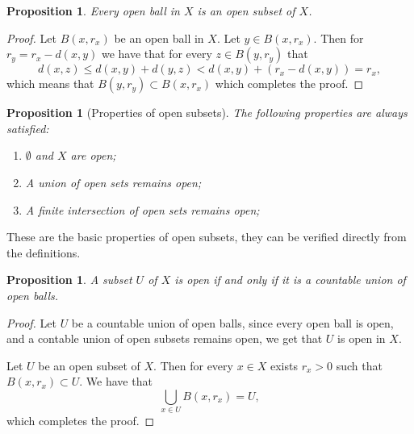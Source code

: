 \documentclass[11pt,a4paper]{article}
\theoremstyle{definition}
\theoremstyle{plain}
\newtheorem{proposition}[theorem]{Proposition}
\begin{document}
  \begin{proposition}
    Every open ball in $X$ is an open subset of $X$.
  \end{proposition}
  \begin{proof}
    Let $B(x,r_x)$ be an open ball in $X$. Let $y \in B(x,r_x)$. Then for
    $r_y = r_x - d(x,y)$ we have that for every $z \in B(y,r_y)$ that
    \[
      d(x,z) \le d(x,y) + d(y,z) < d(x,y) + (r_x - d(x,y)) = r_x,
    \]
    which means that $B(y,r_y) \subset B(x,r_x)$ which completes the proof.
  \end{proof}

  \begin{proposition}[Properties of open subsets]
    The following properties are always satisfied:
    \begin{enumerate}
      \item[(1)] $\emptyset$ and $X$ are open;
      \item[(2)] A union of open sets remains open;
      \item[(3)] A finite intersection of open sets remains open;
    \end{enumerate}
  \end{proposition}
  These are the basic properties of open subsets, they can be verified
  directly from the definitions.

  \begin{proposition}
    A subset $U$ of $X$ is open if and only if it is a countable union of
    open balls.
  \end{proposition}
  \begin{proof}
    Let $U$ be a countable union of open balls, since every open ball is
    open, and a contable union of open subsets remains open, we get that
    $U$ is open in $X$.

    Let $U$ be an open subset of $X$. Then for every $x \in X$ exists
    $r_x > 0$ such that $B(x,r_x) \subset U$. We have that
    \[
      \bigcup_{x \in U} B(x,r_x) = U,
    \]
    which completes the proof.
  \end{proof}
\end{document}
